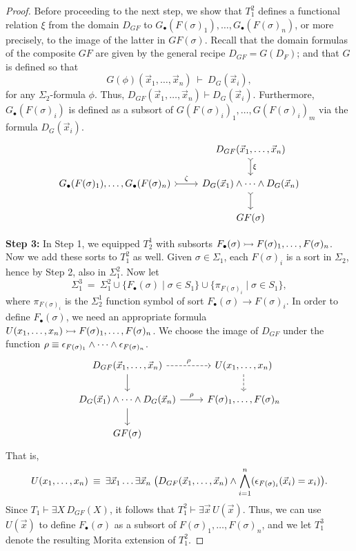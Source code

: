 \begin{proof}
  Before proceeding to the next step, we show that $T_1^2$ defines a
  functional relation $\xi$ from the domain $D_{GF}$ to
  $G_\bullet (F(\sigma )_1),\dots ,G_\bullet (F(\sigma )_n)$, or more
  precisely, to the image of the latter in $GF(\sigma )$.  Recall that
  the domain formulas of the composite $GF$ are given by the general
  recipe $D_{GF}=G(D_F)$; and that $G$ is defined so that
  \[ G(\phi )(\vec{x}_1,\dots ,\vec{x}_n) \: \vdash \: D_G(\vec{x}_i)
    ,\] for any $\Sigma _2$-formula $\phi$.  Thus,
  $D_{GF}(\vec{x}_1,\dots ,\vec{x}_n)\vdash D_G(\vec{x}_i)$.
  Furthermore, $G_\bullet (F(\sigma )_i)$ is defined as a subsort of
  $G(F(\sigma )_i)_1,\dots ,G(F(\sigma )_i)_m$ via the formula
  $D_G(\vec{x}_i)$.
  \[ \begin{tikzcd}
      & D_{GF}(\vec{x}_1,\dots ,\vec{x}_n) \arrow[>->]{d}{\xi} \\
      G_\bullet (F(\sigma )_1),\dots ,G_\bullet (F(\sigma )_n)
      \arrow[>->]{r}{\zeta} & D_G(\vec{x}_1)\wedge\cdots \wedge D_G(\vec{x}_n)  \arrow[>->]{d}
      \\
       & GF(\sigma ) 
     \end{tikzcd} \]

   

\bigskip \textbf{Step 3:} In Step 1, we equipped $T_2^1$ with subsorts
$F_\bullet (\sigma)\rightarrowtail F(\sigma )_1,\dots ,F(\sigma )_n$.  Now we
add these sorts to $T_1^2$ as well.  Given $\sigma\in\Sigma _1$, each
$F(\sigma )_i$ is a sort in $\Sigma _2$, hence by Step 2, also in
$\Sigma _1^2$.  Now let
\[ \Sigma ^3_1 \:=\: \Sigma ^2_1\cup \{ F_\bullet (\sigma )\mid \sigma
  \in S_1\}\cup \{ \pi _{F(\sigma )_i} \mid \sigma \in S_1 \} , \]
where $\pi _{F(\sigma )_i}$ is the $\Sigma _2^1$ function symbol of
sort $F_\bullet (\sigma )\to F(\sigma )_i$.  In order to define
$F_\bullet (\sigma )$, we need an appropriate formula
$U(x_1,\dots ,x_n)\rightarrowtail F(\sigma )_1,\dots ,F(\sigma )_n$.  We choose
the image of $D_{GF}$ under the function $\rho \equiv \epsilon _{F(\sigma
  )_1}\wedge\cdots\wedge \epsilon _{F(\sigma )_n}$.
\[ \begin{tikzcd}
D_{GF}(\vec{x}_1,\dots ,\vec{x}_n) \arrow{d} \arrow[dashed]{r}{\rho} &
U(x_1,\dots ,x_n) \arrow[dashed]{d} \\     
D_G(\vec{x}_1)\wedge\cdots \wedge D_G(\vec{x}_n) \arrow{d}
\arrow{r}{\rho} & F(\sigma )_1,\dots ,F(\sigma )_n \\
GF(\sigma) 
\end{tikzcd} \]
That is,
\[ U(x_1,\dots ,x_n)\: \equiv \: \exists \vec{x}_1\dots \exists
  \vec{x}_n \; \bigl( D_{GF}(\vec{x}_1,\dots ,\vec{x}_n)\wedge
  \bigwedge _{i=1}^n (\epsilon _{F(\sigma )_i}(\vec{x}_i)=x_i) \bigr) .\]
Since $T_1\vdash \exists X\,D_{GF}(X)$, it follows that
$T_1^2\vdash \exists \vec{x}\,U(\vec{x})$.  Thus, we can use
$U(\vec{x})$ to define $F_\bullet (\sigma )$ as a subsort of
$F(\sigma )_1,\dots ,F(\sigma )_n$, and we let $T^3_1$ denote the
resulting Morita extension of $T_1^2$.


\end{proof}
